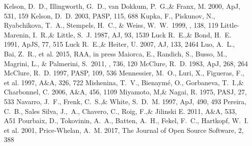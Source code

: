 \documentclass[a4paper,fleqn,usenatbib]{mnras}
\begin{document}
\begin{thebibliography}{99}
Kelson, D.~D., Illingworth, G.~D., van Dokkum, P.~G.,\& Franx, M. 2000, ApJ, 531, 159
Kelson, D.~D. 2003, 
PASP, 115, 688
 Kupka, F., Piskunov, N., Ryabchikova, T.~A., Stempels, H.~C., \& Weiss, W.~W.\ 1999, \aaps, 138, 119 
Little-Marenin, I.~R.,\& Little, S.~J. 1987, 
AJ, 93, 1539
Luck R.~E.,\& Bond, H.~E. 1991, 
ApJS, 77, 515
Luck R.~E.,\& Heiter, U. 2007, 
AJ, 133, 2464
Luo, A.~L., Bai, Z.~R., et al. 2015, 
RAA, in press
 Maiorca, E., Randich, S., Busso, M., Magrini, L., \& Palmerini, S.\ 2011, \apj, 736, 120 
McClure, R.~D. 1983, 
ApJ, 268, 264
McClure, R.~D. 1997, 
PASP, 109, 536
Mennessier, M.~O., Luri, X., Figueras, F., et al. 1997, 
A$\&$A, 326, 722
Mishenina, T.~V., Bienaym\' e, O., Gorbaneva, T.~I.,\& Charbonnel, C. 2006, 
A$\&$A, 456, 1109
Miyamoto, M,\& Nagai, R. 1975, 
PASJ, 27, 533
Navarro, J.~F., Frenk, C.~S.,\& White, S.~D.~M. 1997, 
ApJ, 490, 493
Pereira, C.~B., Sales Silva, J.,~A., Chavero, C., Roig, F.,\& Jilinski E. 2011, 
A$\&$A, 533, A51
Pourbaix, D., Tokovinin, A.~A., Batten, A.~H., Fekel, F.~C., Hartkopf, W.~I. et al. 2001, 
Price-Whelan, A.~M. 2017, 
The Journal of Open Source Software, 2, 388

\end{thebibliography}
\end{document}
